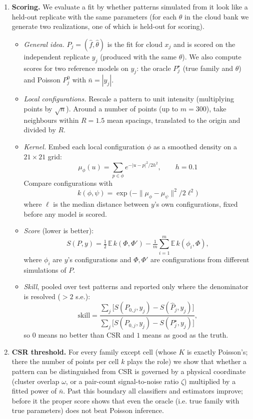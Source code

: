 \documentclass[11pt]{article}
\newcommand{\nb}{\bar n}
\begin{document}
\begin{enumerate}
  \item \textbf{Scoring.} We evaluate a fit by whether patterns simulated from it look like a held-out replicate with the same parameters (for each $\theta$ in the cloud bank we generate two realizations, one of which is held-out for scoring).
  \begin{itemize}
    \item \emph{General idea.} $P_j = (\hat f, \hat \theta)$ is the fit for cloud $x_j$ and is scored on the independent replicate $y_j$ (produced with the same $\theta$). We also compute scores for two reference models on $y_j$: the oracle $P^\star_j$ (true family and $\theta$) and Poisson $P^0_j$ with $\bar n=|y_j|$.
    \item \emph{Local configurations.} Rescale a pattern to unit intensity (multiplying points by $\sqrt{n}$). Around a number of points (up to $m=300$), take neighbours within $R=1.5$ mean spacings, translated to the origin and divided by $R$.
    \item \emph{Kernel.} Embed each local configuration $\phi$ as a smoothed density on a $21\times21$
      grid:
      \[
      \mu_\phi(u)=\sum_{p\in\phi}e^{-|u-p|^2/2h^2}, \qquad h = 0.1
      \]
    Compare configurations with 
    \[
    k(\phi,\psi)=\exp\!\big(-\|\mu_\phi-\mu_\psi\|^2/2\ell^2\big)
    \]
    where $\ell$ is the median distance between $y$'s own configurations, fixed before any model is scored.
    \item \emph{Score} (lower is better):
      \[
        S(P,y)=\tfrac12\,\mathbb{E}\,k(\Phi,\Phi')-\tfrac1m\textstyle\sum_{i=1}^m\mathbb{E}\,k(\phi_i,\Phi),
      \]
      where $\phi_i$ are $y$'s configurations and $\Phi,\Phi'$ are configurations from different
      simulations of $P$.
    \item \emph{Skill}, pooled over test patterns and reported only where the denominator is
      resolved ($>2$ s.e.):
      \[
        \text{skill}=\frac{\sum_j\big[S(P_{0,j},y_j)-S(\hat P_j,y_j)\big]}{\sum_j\big[S(P_{0,j},y_j)-S(P^\star_j,y_j)\big]},
      \]
      so $0$ means no better than CSR and $1$ means as good as the truth.
  \end{itemize}
  \item \textbf{CSR threshold.} For every family except cell (whose $K$ is exactly Poisson's; there the number of points per cell $k$ plays the role) we show that whether a pattern can be distinguished from CSR is governed by a physical coordinate (cluster overlap $\omega$, or a pair-count signal-to-noise ratio $\zeta$) multiplied by a fitted power of $\nb$. Past this boundary all classifiers and estimators improve; before it the proper score shows that even the oracle (i.e. true family with true parameters) does not beat Poisson inference.

\end{enumerate}
\end{document}
